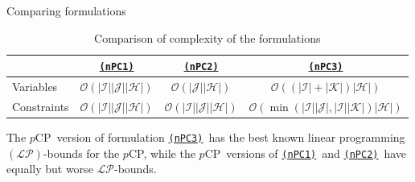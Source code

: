 \documentclass[utf8,aspectratio=169,ngerman,english]{beamer}
\newcommand{\nPC}{\hyperref[eq:nPC]{\texttt{(nPC1)}}}
\newcommand{\nPCE}{\hyperref[eq:nPCE]{\texttt{(nPC3)}}}
\newcommand{\nPCY}{\hyperref[eq:nPCY]{\texttt{(nPC2)}}}
\newcommand{\pCP}{$p$CP}
\begin{document}
\begin{frame}{Comparing formulations}
    \begin{table}[]
        \centering
        \caption{Comparison of complexity of the formulations}
        \label{tab:complexity}
        \begin{tabular}{l|ccc}
            \hline
                        & \nPC                                                     & \nPCY                                                     & \nPCE                                                                                        \\ \hline
            Variables   & $\mathcal O(| \mathcal I || \mathcal J || \mathcal H |)$ & $\mathcal O (| \mathcal J || \mathcal H |)$               & $\mathcal O ((| \mathcal I | + | \mathcal K |) | \mathcal H |)$                              \\
            Constraints & $\mathcal O(| \mathcal I || \mathcal J || \mathcal H |)$ & $\mathcal O (| \mathcal I || \mathcal J || \mathcal H |)$ & $\mathcal O (\min(| \mathcal I || \mathcal J |,| \mathcal I || \mathcal K |)| \mathcal H |)$ \\ \hline
        \end{tabular}%
    \end{table}\pause
    The \pCP\ version of formulation \nPCE\ has the best known linear programming $(\mathcal{LP})$-bounds for the \pCP,
    while the \pCP\ versions of \nPC\ and \nPCY\ have equally but worse $\mathcal{LP}$-bounds.
\end{frame}
\end{document}
